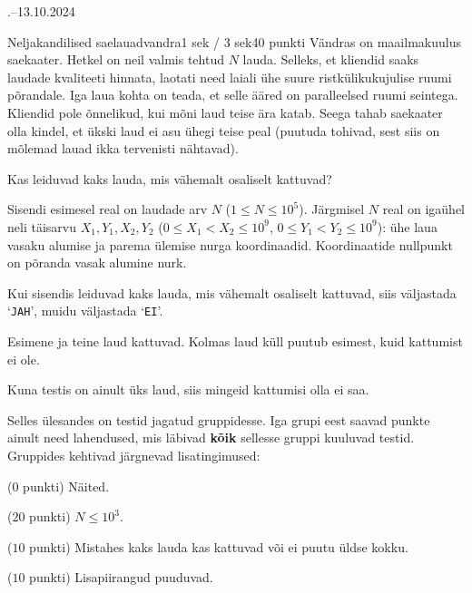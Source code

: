 \documentclass[a4paper,11pt]{article}
\begin{document}
\begin{ol}{\eio}{.--13.10.2024}{\yle}{}
    \begin{yl}{3}{Neljakandilised saelauad}{vandra}{1 sek / 3 sek}{40 punkti}
        Vändras on maailmakuulus saekaater. Hetkel on neil valmis tehtud $N$ lauda. Selleks, et kliendid saaks laudade kvaliteeti hinnata, laotati need laiali ühe suure ristkülikukujulise ruumi põrandale. Iga laua kohta on teada, et selle ääred on paralleelsed ruumi seintega. Kliendid pole õnnelikud, kui mõni laud teise ära katab. Seega tahab saekaater olla kindel, et ükski laud ei asu ühegi teise peal (puutuda tohivad, sest siis on mõlemad lauad ikka tervenisti nähtavad).

        Kas leiduvad kaks lauda, mis vähemalt osaliselt kattuvad?

        \sis Sisendi esimesel real on laudade arv $N$ ($1 \le N \le 10^5$). Järgmisel $N$ real on igaühel neli täisarvu $X_1, Y_1, X_2, Y_2$ ($0 \le X_1 < X_2 \le 10^9$, $0 \le Y_1 < Y_2 \le 10^9$): ühe laua vasaku alumise ja parema ülemise nurga koordinaadid. Koordinaatide nullpunkt on põranda vasak alumine nurk.

        \val Kui sisendis leiduvad kaks lauda, mis vähemalt osaliselt kattuvad, siis väljastada `\verb/JAH/', muidu väljastada `\verb/EI/'.

        \begin{wrapfigure}[3]{r}{0.4\textwidth}
          \centering
          \vspace{-1cm}
        \end{wrapfigure}

        \nde[0]{3cm}{3cm}

        Esimene ja teine laud kattuvad. Kolmas laud küll puutub esimest, kuid kattumist ei ole.

        \nde[1]{3cm}{3cm}
        
        Kuna testis on ainult üks laud, siis mingeid kattumisi olla ei saa.

        \hnd Selles ülesandes on testid jagatud gruppidesse. Iga grupi eest saavad punkte ainult need lahendused, mis läbivad \textbf{kõik} sellesse gruppi kuuluvad testid. Gruppides kehtivad järgnevad lisatingimused:

        \begin{xenum}
            \item ($0$ punkti) Näited.
            \item ($20$ punkti) $N \le 10^3$.
            \item ($10$ punkti) Mistahes kaks lauda kas kattuvad või ei puutu üldse kokku.
            \item ($10$ punkti) Lisapiirangud puuduvad.
        \end{xenum}
    \end{yl}
\end{ol}
\end{document}
